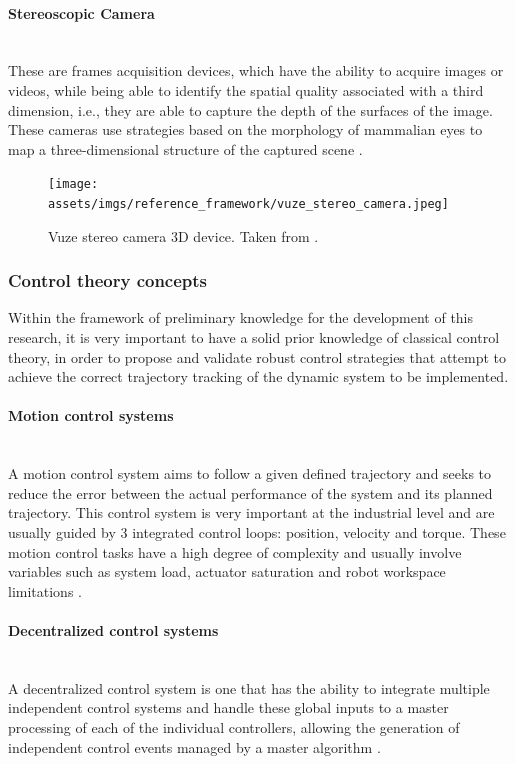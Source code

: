 \documentclass[11pt]{report} %
\newcommand{\subsubsubsection}[1]{\paragraph{#1}\mbox{}\\}
\begin{document}
\subsubsubsection{Stereoscopic Camera}

These are frames acquisition devices, which have the ability to acquire images or videos, while being able to identify the spatial quality associated with a third dimension, i.e., they are able to capture the depth of the surfaces of the image. These cameras use strategies based on the morphology of mammalian eyes to map a three-dimensional structure of the captured scene \citep{cite_stereoscopic_camera_techniques}.\\

\begin{figure}[H]
    \centering
    \texttt{[image: assets/imgs/reference\_framework/vuze\_stereo\_camera.jpeg]}
    \caption{Vuze stereo camera 3D device. Taken from \citep{cite_photo_vuze_stereo_camera_device}.} 
    \label{fig_vuz_stereo_camera_device}
\end{figure}


\subsubsection{Control theory concepts}

Within the framework of preliminary knowledge for the development of this research, it is very important to have a solid prior knowledge of classical control theory, in order to propose and validate robust control strategies that attempt to achieve the correct trajectory tracking of the dynamic system to be implemented.\\

\subsubsubsection{Motion control systems}

A motion control system aims to follow a given defined trajectory and seeks to reduce the error between the actual performance of the system and its planned trajectory. This control system is very important at the industrial level and are usually guided by 3 integrated control loops: position, velocity and torque. These motion control tasks have a high degree of complexity and usually involve variables such as system load, actuator saturation and robot workspace limitations \citep{cite_position_control_for_linear_motion_servo_systems}.\\

\subsubsubsection{Decentralized control systems}

A decentralized control system is one that has the ability to integrate multiple independent control systems and handle these global inputs to a master processing of each of the individual controllers, allowing the generation of independent control events managed by a master algorithm \citep{cite_centralized_control_systems_book}.\\
\end{document}
